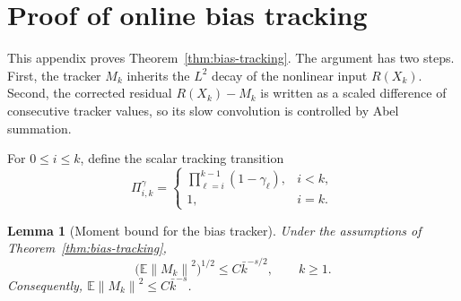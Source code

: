 \documentclass{article}
\newtheorem{lemma}[theorem]{Lemma}
\newcommand{\E}{\mathbb{E}}
\newcommand{\norm}[1]{\left\lVert #1\right\rVert}
\begin{document}
\section{Proof of online bias tracking}
\label{app:bias-tracking-proof}

This appendix proves Theorem~\ref{thm:bias-tracking}. The argument has two steps. First, the tracker $M_k$ inherits the $L^2$ decay of the nonlinear input $R(X_k)$. Second, the corrected residual $R(X_k)-M_k$ is written as a scaled difference of consecutive tracker values, so its slow convolution is controlled by Abel summation.

For $0\le i\le k$, define the scalar tracking transition
\[
  \Pi^\gamma_{i,k}
  =
  \begin{cases}
    \prod_{\ell=i}^{k-1}(1-\gamma_\ell), & i<k,\\
    1, & i=k.
  \end{cases}
\]

\begin{lemma}[Moment bound for the bias tracker]
\label{lem:bias-tracker-moment}
Under the assumptions of Theorem~\ref{thm:bias-tracking},
\[
  \big(\E\norm{M_k}^2\big)^{1/2}\le C\bar k^{-s/2},
  \qquad k\ge1.
\]
Consequently, $\E\norm{M_k}^2\le C\bar k^{-s}$.
\end{lemma}
\end{document}
